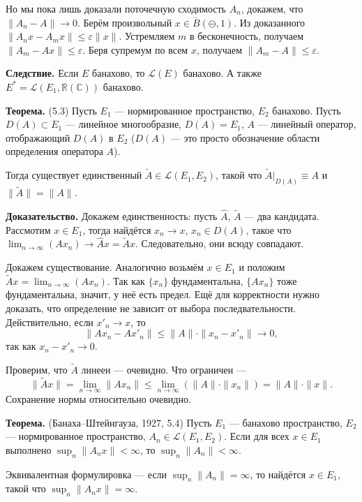 Но мы пока лишь доказали поточечную сходимость $A_n$, докажем, что $\|A_n - A\| \to 0$.
Берём произвольный $x \in \overline B(\ominus, 1)$.
Из доказанного $\|A_n x - A_m x\| \le \varepsilon \|x\|$.
Устремляем $m$ в бесконечность, получаем $\|A_m - Ax\| \le \varepsilon$.
Беря супремум по всем $x$, получаем $\|A_m - A\| \le \varepsilon$.

\QED

\textbf{Следствие.} Если $E$ банахово, то $\mathcal L(E)$ банахово.
А также $E^* = \mathcal L(E_1, \mathbb R (\mathbb C))$ банахово.

\textbf{Теорема.} (5.3) Пусть $E_1$ --- нормированное пространство, $E_2$ банахово.
Пусть $D(A) \subset E_1$ --- линейное многообразие, $\overline{D(A)} = E_1$, $A$ --- линейный оператор, отображающий $D(A)$ в $E_2$ ($D(A)$ --- это просто обозначение области определения оператора $A$).

Тогда существует единственный $\widetilde A \in \mathcal L(E_1, E_2)$, такой что $\widetilde A|_{D(A)} \equiv A$ и $\|\widetilde A\| = \|A\|$.

\textbf{Доказательство.} Докажем единственность: пусть $\widehat A$, $\widetilde A$ --- два кандидата.
Рассмотим $x \in E_1$, тогда найдётся $x_n \to x$, $x_n \in D(A)$, такое что $\lim_{n \to \infty}(Ax_n) \to \widehat Ax = \widetilde Ax$.
Следовательно, они всюду совпадают.

Докажем существование.
Аналогично возьмём $x \in E_1$ и положим $\widetilde Ax = \lim_{n \to \infty}(A x_n)$.
Так как $\{x_n\}$ фундаментальна, $\{A x_n\}$ тоже фундаментальна, значит, у неё есть предел.
Ещё для корректности нужно доказать, что определение не зависит от выбора последвательности.
Действительно, если $x'_n \to x$, то
\[
    \|Ax_n - Ax'_n\| \le \|A\| \cdot \|x_n - x'_n\| \to 0,
\]
так как $x_n - x'_n \to 0$.

Проверим, что $\widetilde A$ линеен --- очевидно.
Что ограничен --- 
\[
    \|\widetilde A x\| = \lim_{n \to \infty} \|Ax_n\| \le \lim_{n \to \infty} \left( \|A\| \cdot \|x_n\| \right) = \|A\| \cdot \|x\|.
\]
Сохранение нормы относительно очевидно.

\QED

\textbf{Теорема.} (Банаха--Штейнгауза, 1927, 5.4)
Пусть $E_1$ --- банахово пространство, $E_2$ --- нормированное пространство, $A_n \in \mathcal L(E_1, E_2)$.
Если для всех $x \in E_1$ выполнено $\sup_n \|A_n x\| < \infty$, то $\sup_n\|A_n\| < \infty$.

Эквивалентная формулировка --- если $\sup_n \|A_n\| = \infty$, то найдётся $x \in E_1$, такой что $\sup_n\|A_n x\| = \infty$.

